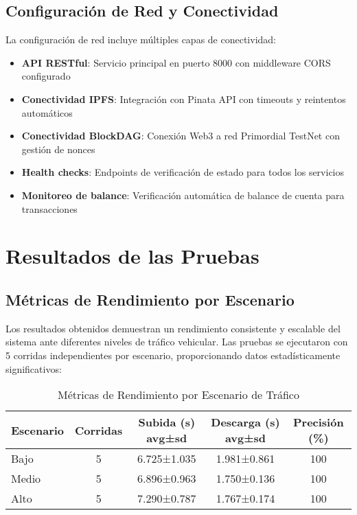 \documentclass[onecolumn]{article}
\begin{document}
\subsection{Configuración de Red y Conectividad}

La configuración de red incluye múltiples capas de conectividad:

\begin{itemize}
    \item \textbf{API RESTful}: Servicio principal en puerto 8000 con middleware CORS configurado
    \item \textbf{Conectividad IPFS}: Integración con Pinata API con timeouts y reintentos automáticos
    \item \textbf{Conectividad BlockDAG}: Conexión Web3 a red Primordial TestNet con gestión de nonces
    \item \textbf{Health checks}: Endpoints de verificación de estado para todos los servicios
    \item \textbf{Monitoreo de balance}: Verificación automática de balance de cuenta para transacciones
\end{itemize}

\section{Resultados de las Pruebas}

\subsection{Métricas de Rendimiento por Escenario}

Los resultados obtenidos demuestran un rendimiento consistente y escalable del sistema ante diferentes niveles de tráfico vehicular. Las pruebas se ejecutaron con 5 corridas independientes por escenario, proporcionando datos estadísticamente significativos:

\begin{table}[H]
\centering
\caption{Métricas de Rendimiento por Escenario de Tráfico}
\begin{tabular}{@{}lcccc@{}}
\toprule
\textbf{Escenario} & \textbf{Corridas} & \textbf{Subida (s) avg±sd} & \textbf{Descarga (s) avg±sd} & \textbf{Precisión (\%)} \\
\midrule
Bajo & 5 & 6.725±1.035 & 1.981±0.861 & 100 \\
Medio & 5 & 6.896±0.963 & 1.750±0.136 & 100 \\
Alto & 5 & 7.290±0.787 & 1.767±0.174 & 100 \\
\bottomrule
\end{tabular}
\end{table}
\end{document}
